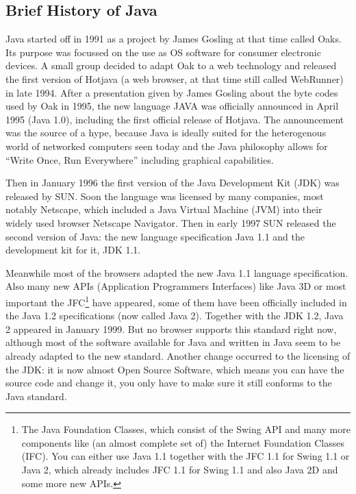 \subsection{Brief History of Java}
Java started off in 1991 as a project by James Gosling at that time called
Oaks. Its purpose was focussed on the use as OS software for consumer
electronic devices. A small group decided to adapt Oak to a web
technology and released the first version of Hotjava (a web browser, at that
time still called WebRunner)
in late 1994. After a presentation given by James Gosling about the 
byte codes used by Oak in 1995, the new language JAVA was officially 
announced in April 1995 (Java 1.0), 
including the first official release of Hotjava.
The announcement was the source of a hype, because Java is ideally
suited for the heterogenous world of networked computers seen today and
the Java philosophy allows for ``Write Once, Run Everywhere'' including
graphical capabilities.

Then in January 1996 the first version of the Java Development Kit (JDK) 
was released by SUN. Soon the language was licensed by many companies,
most notably Netscape, which included a Java Virtual Machine (JVM) into
their widely used browser Netscape Navigator. Then in early 1997
SUN released the second version of Java: the new language specification 
Java 1.1 and the development kit for it, JDK 1.1.

Meanwhile most of the browsers adapted the new Java 1.1 language specification.
Also many new APIs (Application Programmers Interfaces) like Java 3D or 
most important the JFC\footnote{The Java Foundation Classes, which
consist of the Swing API and many more components like (an 
almost complete set of)  
the Internet Foundation Classes (IFC). You can either use Java 1.1 together
with the JFC 1.1 for Swing 1.1 or Java 2, which already includes JFC 1.1 for
Swing 1.1 and also Java 2D and some more new APIs.}
have appeared, some
of them have been officially included in the Java 1.2 specifications
(now called Java 2). Together with the JDK 1.2, Java 2 appeared in January 1999.
But no browser supports this standard right now, although most
of the software available for Java and written in Java seem to be
already adapted to the new standard. Another change occurred to the
licensing of the JDK: it is now almost Open Source Software, which
means you can have the source code and change it, you only have to make
sure it still conforms to the Java standard.

